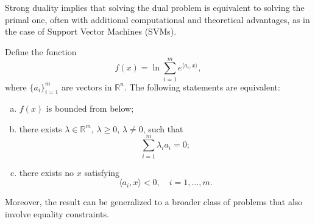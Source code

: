 \documentclass[../main]{subfiles}
\begin{document}
\noindent
\begin{remark}
Strong duality implies that solving the dual problem is equivalent to solving the primal one,
often with additional computational and theoretical advantages, as in the case of Support Vector Machines (SVMs).
\end{remark}
\begin{lemma}
    \label{thm:3.14}
    Define the function
    \begin{equation}
        f(x) = \ln \sum_{i=1}^{m} e^{\langle a_i, x \rangle},
    \end{equation}
    where $\{a_i\}_{i=1}^{m}$ are vectors in $\mathbb{R}^n$.  
    The following statements are equivalent:
    \begin{enumerate}[(a)]
        \item $f(x)$ is bounded from below;
        \item there exists $\lambda \in \mathbb{R}^m$, $\lambda \ge 0$, $\lambda \ne 0$, such that
        \begin{equation}
            \sum_{i=1}^{m} \lambda_i a_i = 0;
        \end{equation}
        \item there exists no $x$ satisfying
        \begin{equation}
            \langle a_i, x \rangle < 0, \quad i = 1, \ldots, m.
        \end{equation}
    \end{enumerate}
    \end{lemma}
    Moreover, the result can be generalized to a broader class of problems that also involve equality constraints.
\end{document}
